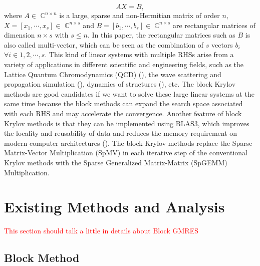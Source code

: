 \begin{equation}
\label{ax=b}
AX =  B,
\end{equation}
where $A \in$ $\mathbb{C}^{n \times n}$ is a large, sparse and non-Hermitian matrix of order $n$, $X=[x_1,\cdots,x_s] \in$  $\mathbb{C}^{n \times s}$ and $B=[b_1,\cdots,b_s] \in$  $\mathbb{C}^{n \times s}$ are rectangular matrices of dimension $n \times s$ with $s \leq n$. In this paper, the rectangular matrices such as $B$ is also called multi-vector, which can be seen as the combination of $s$ vectors $b_i$ $\forall i \in 1, 2, \cdots, s$. This kind of linear systems with multiple RHSs arise from a variety of applications in different scientific and engineering fields, such as the Lattice Quantum Chromodynamics (QCD) (\cite{sakurai2010application, nakamura2012modified, fiebach1997variants}), the wave scattering and propagation simulation (\cite{malhotra1997iterative}), dynamics of structures (\cite{barbella2011block, ferraz2001block, nour1985short}), etc. The block Krylov methods are good candidates if we want to solve these large linear systems at the same time because the block methods can expand the search space associated with each RHS and may accelerate the convergence. Another feature of block Krylov methods is that they can be implemented using BLAS3, which improves the locality and reusability of data and reduces the memory requirement on modern computer architectures (\cite{agullo2014block}). The block Krylov methods replace the Sparse Matrix-Vector Multiplication (SpMV) in each iterative step of the conventional Krylov methods with the Sparse Generalized Matrix-Matrix (SpGEMM) Multiplication.


\section{Existing Methods and Analysis}

\textcolor{red}{This section should talk a little in details about Block GMRES}

\subsection{Block Method}

